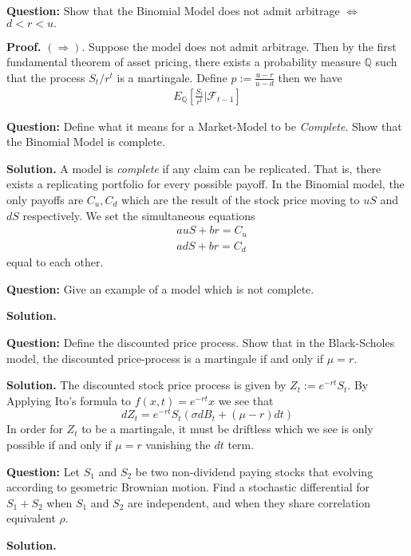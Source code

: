 \documentclass{article}
\begin{document}
\begin{tcolorbox}[colframe=black,colback=gray!5,boxrule=0.5pt]
\textbf{Question:} Show that the Binomial Model does not admit arbitrage $\iff$ $d<r<u.$
\end{tcolorbox}
\textbf{Proof.}
$(\Rightarrow)$. Suppose the model does not admit arbitrage. Then by the first fundamental theorem of asset pricing, there exists a probability measure $\mathbb{Q}$ such that the process $S_t / r^t$ is a martingale. Define $p:= \frac{u-r}{u-d}$ then we have 
\begin{align*}
    E_\mathbb{Q}\left[\frac{S_t}{r^t} | \mathcal{F}_{t-1}\right]
\end{align*}
 
\begin{tcolorbox}[colframe=black,colback=gray!5,boxrule=0.5pt]
\textbf{Question:} Define what it means for a Market-Model to be \textit{Complete}. Show that the Binomial Model is complete. 
\end{tcolorbox}
\textbf{Solution.} A model is \textit{complete} if any claim can be replicated. That is, there exists a replicating portfolio for every possible payoff. In the Binomial model, the only payoffs are $C_u, C_d$ which are the result of the stock price moving to $uS$ and $dS$ respectively. We set the simultaneous equations 
\begin{align*}
    & auS + br = C_u \\
    & adS + br = C_d
\end{align*}
equal to each other.


\begin{tcolorbox}[colframe=black,colback=gray!5,boxrule=0.5pt]
\textbf{Question:} Give an example of a model which is not complete. 
\end{tcolorbox}
\textbf{Solution.}

\begin{tcolorbox}[colframe=black,colback=gray!5,boxrule=0.5pt]
\textbf{Question:} Define the discounted price process. Show that in the Black-Scholes model, the discounted price-process is a martingale if and only if $\mu = r$.
\end{tcolorbox}
\textbf{Solution.} The discounted stock price process is given by $Z_t := e^{-rt}S_t$. By Applying Ito's formula to $f(x,t) = e^{-rt}x$ we see that 
$$dZ_t = e^{-rt}S_t(\sigma dB_t + (\mu-r)dt)$$
In order for $Z_t$ to be a martingale, it must be driftless which we see is only possible if and only if $\mu = r$ vanishing the $dt$ term.


\begin{tcolorbox}[colframe=black,colback=gray!5,boxrule=0.5pt]
\textbf{Question:} Let $S_1$ and $S_2$ be two non-dividend paying stocks that evolving according to geometric Brownian motion. Find a stochastic differential for $S_1 + S_2$ when $S_1$ and $S_2$ are independent, and when they share correlation equivalent $\rho$.  \cite{Hull}
\end{tcolorbox}
\textbf{Solution.}
\end{document}
